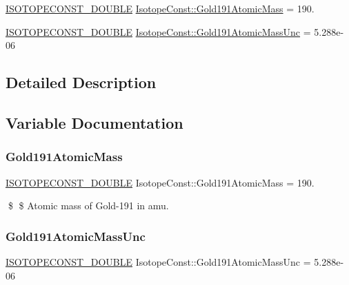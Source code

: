 \begin{DoxyCompactItemize}
\item 
\mbox{\hyperlink{group___isotope_const-_macros_ga8f45a7272ce02c0b4c65c44636ed719a}{I\+S\+O\+T\+O\+P\+E\+C\+O\+N\+S\+T\+\_\+\+D\+O\+U\+B\+LE}} \mbox{\hyperlink{group___isotope_const-_gold-_au191_ga47073ff00e703f2588d09a7d62c60a23}{Isotope\+Const\+::\+Gold191\+Atomic\+Mass}} = 190.
\item 
\mbox{\hyperlink{group___isotope_const-_macros_ga8f45a7272ce02c0b4c65c44636ed719a}{I\+S\+O\+T\+O\+P\+E\+C\+O\+N\+S\+T\+\_\+\+D\+O\+U\+B\+LE}} \mbox{\hyperlink{group___isotope_const-_gold-_au191_ga96d1f9813b44165f560770b78d67b56a}{Isotope\+Const\+::\+Gold191\+Atomic\+Mass\+Unc}} = 5.\+288e-\/06
\end{DoxyCompactItemize}


\subsection{Detailed Description}


\subsection{Variable Documentation}
\mbox{\label{group___isotope_const-_gold-_au191_ga47073ff00e703f2588d09a7d62c60a23}} 
\subsubsection{\texorpdfstring{Gold191\+Atomic\+Mass}{Gold191AtomicMass}}
{\footnotesize\ttfamily \mbox{\hyperlink{group___isotope_const-_macros_ga8f45a7272ce02c0b4c65c44636ed719a}{I\+S\+O\+T\+O\+P\+E\+C\+O\+N\+S\+T\+\_\+\+D\+O\+U\+B\+LE}} Isotope\+Const\+::\+Gold191\+Atomic\+Mass = 190.}

\$ \$ Atomic mass of Gold-\/191 in amu. \mbox{\label{group___isotope_const-_gold-_au191_ga96d1f9813b44165f560770b78d67b56a}} 
\subsubsection{\texorpdfstring{Gold191\+Atomic\+Mass\+Unc}{Gold191AtomicMassUnc}}
{\footnotesize\ttfamily \mbox{\hyperlink{group___isotope_const-_macros_ga8f45a7272ce02c0b4c65c44636ed719a}{I\+S\+O\+T\+O\+P\+E\+C\+O\+N\+S\+T\+\_\+\+D\+O\+U\+B\+LE}} Isotope\+Const\+::\+Gold191\+Atomic\+Mass\+Unc = 5.\+288e-\/06}

